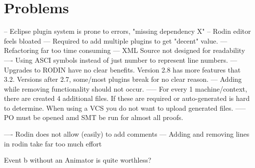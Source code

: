 \section{Problems}
-- Eclipse plugin system is prone to errors, "missing dependency X"
-- Rodin editor feels bloated
--- Required to add multiple plugins to get "decent" value.
--- Refactoring far too time consuming
--- XML Source not designed for readability
---- Using ASCI symbols instead of just number to represent line numbers.
--- Upgrades to RODIN have no clear benefits. Version 2.8 has more features that 3.2. Versions after 2.7, some/most plugins break for no clear reason.
--- Adding while removing functionality should not occur. 
----- For every 1 machine/context, there are created 4 additional files. If these are required or auto-generated is hard to determine. When using a VCS you do not want to upload generated files.  
----- PO must be opened amd SMT be run for almost all proofs.

---- Rodin does not allow (easily) to add comments
--- Adding and removing lines in rodin take far too much effort

Event b without an Animator is quite worthless? 